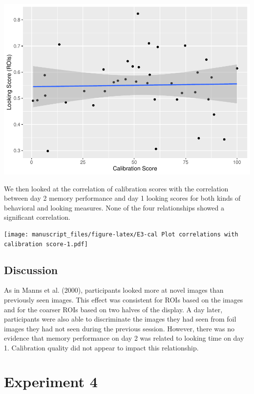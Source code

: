\documentclass[
  man,floatsintext]{apa6}
\begin{document}
\includegraphics{manuscript_files/figure-latex/E3-cal Plot looking score (roi) by calibration-1.pdf}

We then looked at the correlation of calibration scores with the correlation between day 2 memory performance and day 1 looking scores for both kinds of behavioral and looking measures. None of the four relationships showed a significant correlation.

\texttt{[image: manuscript\_files/figure-latex/E3-cal Plot correlations with calibration score-1.pdf]}

\hypertarget{discussion-2}{%
\subsection{Discussion}\label{discussion-2}}

As in Manns et al. (2000), participants looked more at novel images than previously seen images. This effect was consistent for ROIs based on the images and for the coarser ROIs based on two halves of the display. A day later, participants were also able to discriminate the images they had seen from foil images they had not seen during the previous session. However, there was no evidence that memory performance on day 2 was related to looking time on day 1. Calibration quality did not appear to impact this relationship.

\hypertarget{experiment-4}{%
\section{Experiment 4}\label{experiment-4}}
\end{document}
